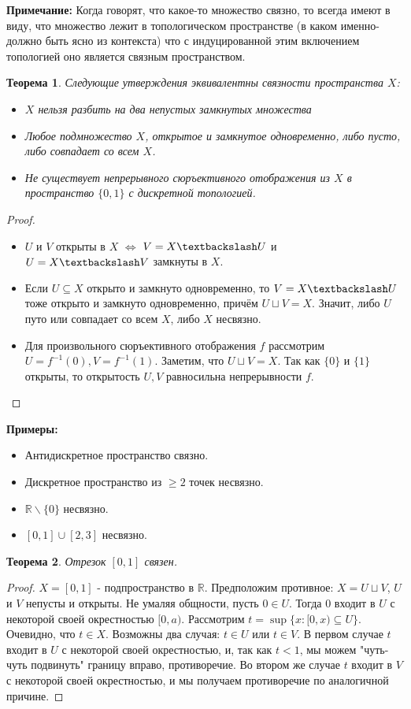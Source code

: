 \documentclass[a4paper,100pt]{article}
\theoremstyle{indented}
\newtheorem{theorem}{Теорема}
\begin{document}
\textbf{Примечание:} Когда говорят, что какое-то множество связно, то всегда имеют в виду, что множество лежит в топологическом пространстве (в каком именно- должно быть ясно из контекста) что с индуцированной этим включением топологией оно является связным пространством.\\

\begin{theorem}
Следующие утверждения эквивалентны связности пространства $X$:
\begin{itemize}
    \item $X$ нельзя разбить на два непустых замкнутых множества
    \item Любое подмножество $X$, открытое и замкнутое одновременно, либо пусто, либо совпадает со всем $X$.
    \item Не существует непрерывного сюръективного отображения из $X$ в пространство $\{0, 1\}$ с дискретной топологией.
\end{itemize}
\end{theorem}
\begin{proof}
~
\begin{itemize}
    \item $U$ и $V$ открыты в $X$ $\iff$ $V=X \textbackslash U$ и $U = X \textbackslash V$ замкнуты в $X$.
    \item Если $U \subseteq X$ открыто и замкнуто одновременно, то $V=X \textbackslash U$ тоже открыто и замкнуто одновременно, причём $U \sqcup V = X$. Значит, либо $U$ путо или совпадает со всем $X$, либо $X$ несвязно.
    \item Для произвольного сюръективного отображения $f$ рассмотрим $U=f^{-1}(0), V=f^{-1}(1)$. Заметим, что $U \sqcup V = X$. Так как $\{0\}$ и $\{1\}$ открыты, то открытость $U, V$ равносильна непрерывности $f$.
\end{itemize}
\end{proof}
\textbf{Примеры:} 
\begin{itemize}
    \item Антидискретное пространство связно.
    \item Дискретное пространство из $\geq 2$ точек несвязно.
    \item $\mathbb{R} \backslash \{0\}$ несвязно.
    \item $[0, 1] \cup [2, 3]$ несвязно.
\end{itemize}
\begin{theorem}
Отрезок $[0, 1]$ связен.
\end{theorem}
\begin{proof}
$X=[0, 1]$ - подпространство в $\mathbb{R}$. Предположим противное: $X=U \sqcup V$, $U $ и $V$ непусты и открыты. Не умаляя общности, пусть $0 \in U$. Тогда $0$ входит в $U$ с некоторой своей окрестностью $[0, a)$. Рассмотрим $t=\sup\{x: [0, x) \subseteq U\}$. Очевидно, что $t \in X$. Возможны два случая: $t \in U$ или $t \in V$. В первом случае $t$ входит в $U$ с некоторой своей окрестностью, и, так как $t < 1$, мы можем "чуть-чуть подвинуть" границу вправо, противоречие. Во втором же случае $t$ входит в $V$ с некоторой своей окрестностью, и мы получаем противоречие по аналогичной причине.
\end{proof}
\end{document}
